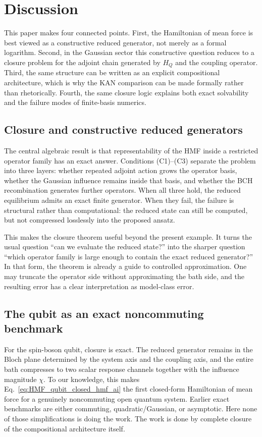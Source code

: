 \section{Discussion}
\label{sec:discussion}

This paper makes four connected points. First, the Hamiltonian of mean force is
best viewed as a constructive reduced generator, not merely as a formal
logarithm. Second, in the Gaussian sector this constructive question reduces to
a closure problem for the adjoint chain generated by \(H_Q\) and the coupling
operator. Third, the same structure can be written as an explicit
compositional architecture, which is why the KAN comparison can be made
formally rather than rhetorically. Fourth, the same closure logic explains both
exact solvability and the failure modes of finite-basis numerics.

\subsection*{Closure and constructive reduced generators}

The central algebraic result is that representability of the HMF inside a
restricted operator family has an exact answer. Conditions (C1)--(C3) separate
the problem into three layers: whether repeated adjoint action grows the
operator basis, whether the Gaussian influence remains inside that basis, and
whether the BCH recombination generates further operators. When all three hold,
the reduced equilibrium admits an exact finite generator. When they fail, the
failure is structural rather than computational: the reduced state can still be
computed, but not compressed losslessly into the proposed ansatz.

This makes the closure theorem useful beyond the present example. It turns the
usual question ``can we evaluate the reduced state?'' into the sharper question
``which operator family is large enough to contain the exact reduced
generator?'' In that form, the theorem is already a guide to controlled
approximation. One may truncate the operator side without approximating the bath
side, and the resulting error has a clear interpretation as model-class error.

\subsection*{The qubit as an exact noncommuting benchmark}

For the spin-boson qubit, closure is exact. The reduced generator remains in
the Bloch plane determined by the system axis and the coupling axis, and the
entire bath compresses to two scalar response channels together with the
influence magnitude \(\chi\). To our knowledge, this makes
Eq.~\eqref{eq:HMF_qubit_closed_hmf_ai} the first closed-form Hamiltonian of
mean force for a genuinely noncommuting open quantum system. Earlier exact
benchmarks are either commuting, quadratic/Gaussian, or asymptotic. Here none
of those simplifications is doing the work. The work is done by complete
closure of the compositional architecture itself.

